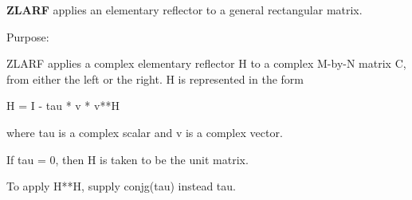 {\bfseries Z\+L\+A\+R\+F} applies an elementary reflector to a general rectangular matrix. 

 \begin{DoxyParagraph}{Purpose\+: }
\begin{DoxyVerb} ZLARF applies a complex elementary reflector H to a complex M-by-N
 matrix C, from either the left or the right. H is represented in the
 form

       H = I - tau * v * v**H

 where tau is a complex scalar and v is a complex vector.

 If tau = 0, then H is taken to be the unit matrix.

 To apply H**H, supply conjg(tau) instead
 tau.\end{DoxyVerb}
 
\end{DoxyParagraph}

